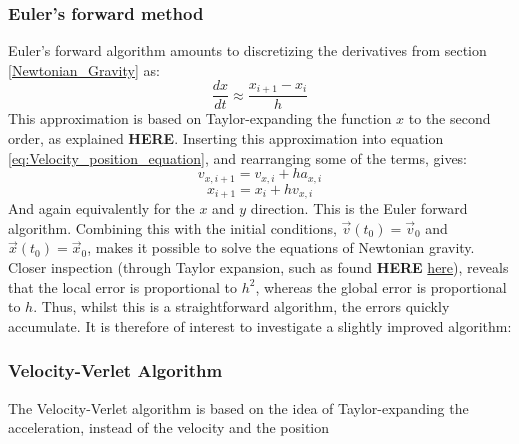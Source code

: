 \documentclass[a4paper, 10pt]{article}
\begin{document}
\subsubsection{Euler's forward method}
Euler's forward algorithm amounts to discretizing the derivatives from section \ref{Newtonian_Gravity} as:
\begin{equation}
\frac{dx}{dt}\approx \frac{x_{i+1}-x_i}{h}
\end{equation}
This approximation is based on Taylor-expanding the function $x$ to the second order, as explained \textbf{HERE}. Inserting this approximation into equation \ref{eq:Velocity_position_equation}, and rearranging some of the terms, gives:
\begin{equation}
v_{x, i+1}=v_{x,i}+ha_{x,i}
\end{equation}
\begin{equation}
x_{i+1}=x_i+hv_{x,i}
\end{equation}
And again equivalently for the $x$ and $y$ direction. This is the Euler forward algorithm. Combining this with the initial conditions, $\vec{v}(t_0)=\vec{v}_0$ and $\vec{x}(t_0)=\vec{x}_0$, makes it possible to solve the equations of Newtonian gravity. Closer inspection (through Taylor expansion, such as found \textbf{HERE} \href{http://www.math.unl.edu/~gledder1/Math447/EulerError}{here}), reveals that the local error is proportional to $h^2$, whereas the global error is proportional to $h$. Thus, whilst this is a straightforward algorithm, the errors quickly accumulate. It is therefore of interest to investigate a slightly improved algorithm:

\subsubsection{Velocity-Verlet Algorithm}
The Velocity-Verlet algorithm is based on the idea of Taylor-expanding the acceleration, instead of the velocity and the position
\end{document}
